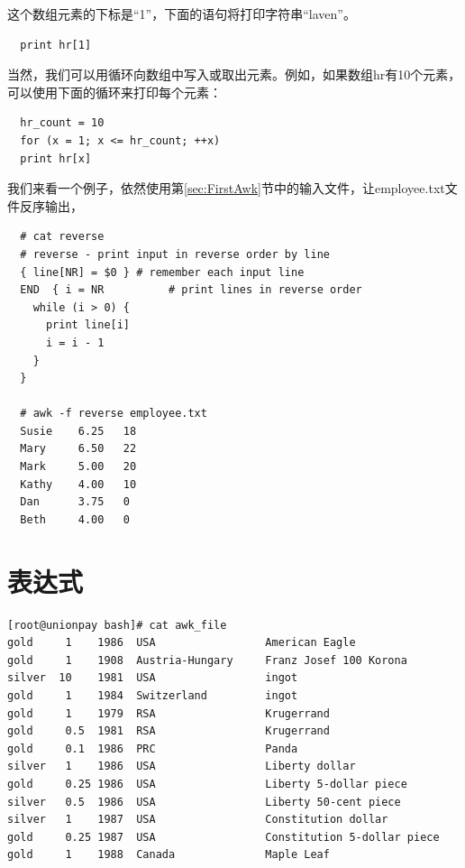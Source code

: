 这个数组元素的下标是“1”，下面的语句将打印字符串“laven”。

\begin{verbatim}
  print hr[1]
\end{verbatim}

当然，我们可以用循环向数组中写入或取出元素。例如，如果数组hr有10个元素，
可以使用下面的循环来打印每个元素：

\begin{verbatim}
  hr_count = 10
  for (x = 1; x <= hr_count; ++x)
  print hr[x]
\end{verbatim}

我们来看一个例子，依然使用第\ref{sec:FirstAwk}节中的输入文件，让employee.txt文件反序输出，

\small{
\begin{verbatim}
  # cat reverse
  # reverse - print input in reverse order by line
  { line[NR] = $0 } # remember each input line
  END  { i = NR          # print lines in reverse order
    while (i > 0) {
      print line[i]
      i = i - 1
    }
  }
  
  # awk -f reverse employee.txt
  Susie    6.25   18
  Mary     6.50   22
  Mark     5.00   20
  Kathy    4.00   10
  Dan      3.75   0
  Beth     4.00   0
\end{verbatim}
}
\normalsize

\section{表达式}

\begin{verbatim}
[root@unionpay bash]# cat awk_file 
gold     1    1986  USA                 American Eagle
gold     1    1908  Austria-Hungary     Franz Josef 100 Korona
silver  10    1981  USA                 ingot
gold     1    1984  Switzerland         ingot
gold     1    1979  RSA                 Krugerrand
gold     0.5  1981  RSA                 Krugerrand
gold     0.1  1986  PRC                 Panda
silver   1    1986  USA                 Liberty dollar
gold     0.25 1986  USA                 Liberty 5-dollar piece
silver   0.5  1986  USA                 Liberty 50-cent piece
silver   1    1987  USA                 Constitution dollar
gold     0.25 1987  USA                 Constitution 5-dollar piece
gold     1    1988  Canada              Maple Leaf
\end{verbatim}

